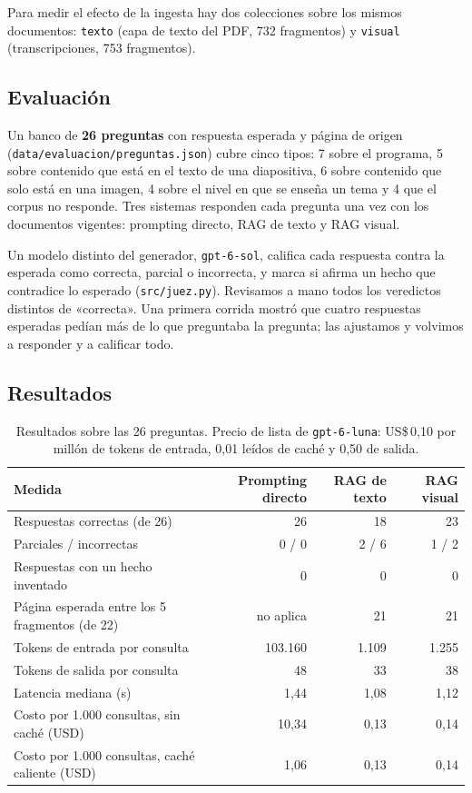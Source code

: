 \documentclass[11pt,letterpaper]{article}
\newcommand{\cod}[1]{\texttt{\small #1}}
\begin{document}
Para medir el efecto de la ingesta hay dos colecciones sobre los mismos documentos: \cod{texto} (capa de texto del PDF, 732 fragmentos) y \cod{visual} (transcripciones, 753 fragmentos).

\subsection{Evaluación}

Un banco de \textbf{26 preguntas} con respuesta esperada y página de origen (\cod{data/evaluacion/preguntas.json}) cubre cinco tipos: 7 sobre el programa, 5 sobre contenido que está en el texto de una diapositiva, 6 sobre contenido que solo está en una imagen, 4 sobre el nivel en que se enseña un tema y 4 que el corpus no responde. Tres sistemas responden cada pregunta una vez con los documentos vigentes: prompting directo, RAG de texto y RAG visual.

Un modelo distinto del generador, \cod{gpt-6-sol}, califica cada respuesta contra la esperada como correcta, parcial o incorrecta, y marca si afirma un hecho que contradice lo esperado (\cod{src/juez.py}). Revisamos a mano todos los veredictos distintos de «correcta». Una primera corrida mostró que cuatro respuestas esperadas pedían más de lo que preguntaba la pregunta; las ajustamos y volvimos a responder y a calificar todo.

\subsection{Resultados}

\begin{table}[H]\small\renewcommand{\arraystretch}{1.15}\centering
\begin{tabular}{lrrr}
\toprule
\textbf{Medida} & \textbf{Prompting directo} & \textbf{RAG de texto} & \textbf{RAG visual} \\
\midrule
Respuestas correctas (de 26) & 26 & 18 & 23 \\
Parciales / incorrectas & 0 / 0 & 2 / 6 & 1 / 2 \\
Respuestas con un hecho inventado & 0 & 0 & 0 \\
Página esperada entre los 5 fragmentos (de 22) & no aplica & 21 & 21 \\
Tokens de entrada por consulta & 103.160 & 1.109 & 1.255 \\
Tokens de salida por consulta & 48 & 33 & 38 \\
Latencia mediana (s) & 1,44 & 1,08 & 1,12 \\
Costo por 1.000 consultas, sin caché (USD) & 10,34 & 0,13 & 0,14 \\
Costo por 1.000 consultas, caché caliente (USD) & 1,06 & 0,13 & 0,14 \\
\bottomrule
\end{tabular}
\caption{Resultados sobre las 26 preguntas. Precio de lista de \cod{gpt-6-luna}: US\$\,0,10 por millón de tokens de entrada, 0,01 leídos de caché y 0,50 de salida.}
\label{tab:resultados}
\end{table}
\end{document}
